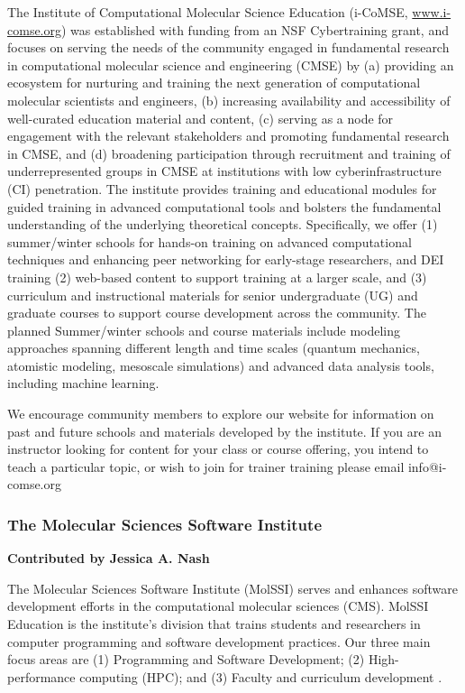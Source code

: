 \documentclass[9pt,review]{livecoms}
\begin{document}
The Institute of Computational Molecular Science Education (i-CoMSE, \href{www.i-comse.org}{www.i-comse.org}) was established with funding from an NSF Cybertraining grant, and focuses on serving the needs of the community engaged in fundamental research in computational molecular science and engineering (CMSE) by (a) providing an ecosystem for nurturing and training the next generation of computational molecular scientists and engineers, (b) increasing availability and accessibility of well-curated education material and content, (c) serving as a node for engagement with the relevant stakeholders and promoting fundamental research in CMSE, and (d) broadening participation through recruitment and training of underrepresented groups in CMSE at institutions with low cyberinfrastructure (CI) penetration. 
The institute provides training and educational modules for guided training in advanced computational tools and bolsters the fundamental understanding of the underlying theoretical concepts. Specifically, we offer (1) summer/winter schools for hands-on training on advanced computational techniques and enhancing peer networking for early-stage researchers, and DEI training (2) web-based content to support training at a larger scale, and (3) curriculum and instructional materials for senior undergraduate (UG) and graduate courses to support course development across the community. The planned Summer/winter schools and course materials include modeling approaches spanning different length and time scales (quantum mechanics, atomistic modeling, mesoscale simulations) and advanced data analysis tools, including machine learning. 

 We encourage community members to explore our website for information on past and future schools and materials developed by the institute. If you are an instructor looking for content for your class or course offering, you intend to teach a particular topic, or wish to join for trainer training please email info@i-comse.org

\subsubsection{The Molecular Sciences Software Institute}

\textbf{Contributed by Jessica A. Nash}

 The Molecular Sciences Software Institute (MolSSI) serves and enhances software development efforts in the computational molecular sciences (CMS). MolSSI Education is the institute's division that trains students and researchers in computer programming and software development practices. Our three main focus areas are (1) Programming and Software Development; (2) High-performance computing (HPC); and (3) Faculty and curriculum development \cite{NashCISE}. 
\end{document}

